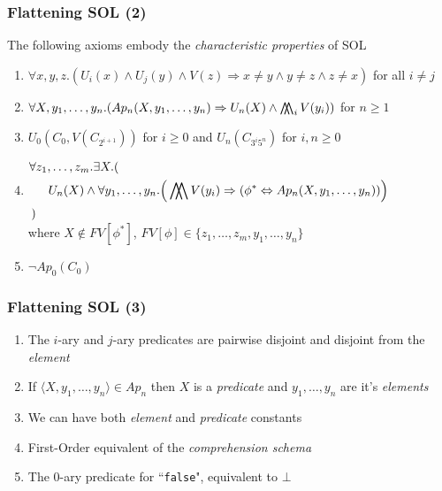\documentclass{beamer}
\newcommand{\bigdoublewedge}{
  \mathop{
    \mathchoice{\bigwedge\mkern-15mu\bigwedge}
               {\bigwedge\mkern-12.5mu\bigwedge}
               {\bigwedge\mkern-12.5mu\bigwedge}
               {\bigwedge\mkern-11mu\bigwedge}
    }
}
\begin{document}
                \begin{frame}
                    \frametitle{Flattening SOL (2)}
                    The following axioms embody the \textit{characteristic properties} of SOL
                    \vspace*{.5cm}
                    \begin{enumerate}
                        \item $ \forall x, y, z.(U_i(x) \wedge U_j(y) \wedge V(z) \Rightarrow x \neq y \wedge y \neq z \wedge z \neq x) $ for all $ i \neq j $
                        \item $ \forall X, y_1, \dots, y_n.(Ap_n(X, y_1, \dots, y_n) \Rightarrow U_n(X) \wedge \bigdoublewedge_i V(y_i)) $ for $ n \geq 1 $
                        \item $ U_0(C_0, V(C_{2^{i + 1}})) $ for $ i \geq 0 $ and $ U_n(C_{3^i5^n}) $ for $ i, n \geq 0 $
                        \item $ \begin{aligned}
                            \forall &z_1, \dots, z_m. \exists X.(\\
                            &\quad U_n(X) \wedge \forall y_1, \dots, y_n. \Big (\bigdoublewedge V(y_i) \Rightarrow (\phi^* \Leftrightarrow Ap_n(X, y_1, \dots, y_n))\Big )\\
                            ) \end{aligned} $ \\[-1\baselineskip]\quad where $ X \not\in FV[\phi^*] $, $ FV[\phi] \in \{ z_1, \dots, z_m, y_1, \dots, y_n \} $
                        \item $ \neg Ap_0(C_0) $
                    \end{enumerate}
                \end{frame}

                \begin{frame}
                    \frametitle{Flattening SOL (3)}
                    \begin{enumerate}
                        \item The $ i $-ary and $ j $-ary predicates are pairwise disjoint and disjoint from the \textit{element}
                        \item If $ \langle X, y_1, \dots, y_n \rangle \in Ap_n $ then $ X $ is a \textit{predicate} and $ y_1, \dots, y_n $ are it's \textit{elements}
                        \item We can have both \textit{element} and \textit{predicate} constants
                        \item First-Order equivalent of the \textit{comprehension schema}
                        \item The 0-ary predicate for ``\texttt{false}", equivalent to $ \bot $
                    \end{enumerate}
                \end{frame}
\end{document}
